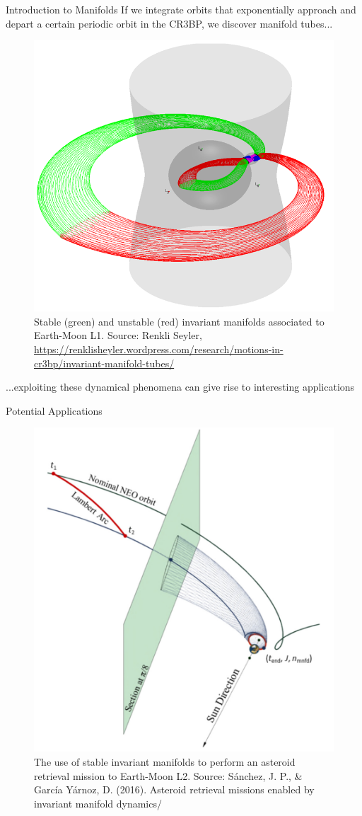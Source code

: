 \documentclass[10pt]{beamer}
\begin{document}
\begin{frame}[fragile]{Introduction to Manifolds}
	\small If we integrate orbits that exponentially approach and depart a certain periodic orbit in the CR3BP, we discover manifold tubes...
	\begin{figure}
		\centering
		\includegraphics[height=.4\textheight]{manifolds}
		\caption{\small Stable (green) and unstable (red) invariant manifolds associated to Earth-Moon L1. Source: Renkli Seyler, \url{https://renklisheyler.wordpress.com/research/motions-in-cr3bp/invariant-manifold-tubes/}}
	\end{figure}
	\small ...exploiting these dynamical phenomena can give rise to interesting applications

\end{frame}

\begin{frame}{Potential Applications}
	\begin{figure}
		\centering
		\includegraphics[height=.5\linewidth]{neo_retrieval.png}
		\caption{The use of stable invariant manifolds to perform an asteroid retrieval mission to Earth-Moon L2. Source: Sánchez, J. P., \& García Yárnoz, D. (2016). Asteroid retrieval missions enabled by invariant manifold dynamics/}
	\end{figure}
\end{frame}
\end{document}
